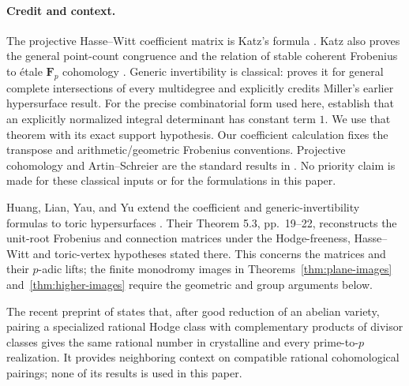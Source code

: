 \documentclass[11pt]{article}
\begin{document}
\paragraph{Credit and context.}
The projective Hasse--Witt coefficient matrix is Katz's formula \citep[\S2.3.7, pp.~34--36, especially Algorithm~2.3.7.14 and formula~2.3.7.16]{Katz1972}. Katz also proves the general point-count congruence and the relation of stable coherent Frobenius to \'etale $\mathbf F_p$ cohomology \citep[Expos\'e XXII, Proposition~2.0 and Corollary~2.1, pp.~406--407; Theorem~3.1 and Corollary~3.2, pp.~410--411]{Katz}. Generic invertibility is classical: \citet[Theorem~3, p.~142; proof pp.~142--144]{Koblitz} proves it for general complete intersections of every multidegree and explicitly credits Miller's earlier hypersurface result. For the precise combinatorial form used here, \citet[Theorem~2.3, p.~2; Proposition~2.11, p.~3 of the arXiv version]{AdolphsonSperber} establish that an explicitly normalized integral determinant has constant term $1$. We use that theorem with its exact support hypothesis. Our coefficient calculation fixes the transpose and arithmetic/geometric Frobenius conventions. Projective cohomology and Artin--Schreier are the standard results in \citet[Lemma~30.8.1 and Section~59.63]{StacksProjective,StacksAS}. No priority claim is made for these classical inputs or for the formulations in this paper.

Huang, Lian, Yau, and Yu extend the coefficient and generic-invertibility formulas to toric hypersurfaces \citep[author version, Corollaries 2.3 and 2.8, pp.\ 8--11]{HLYY}. Their Theorem 5.3, pp.\ 19--22, reconstructs the unit-root Frobenius and connection matrices under the Hodge-freeness, Hasse--Witt and toric-vertex hypotheses stated there. This concerns the matrices and their $p$-adic lifts; the finite monodromy images in Theorems~\ref{thm:plane-images} and~\ref{thm:higher-images} require the geometric and group arguments below.

The recent preprint of \citet[Theorem~1.1, pp.~1--2]{OpenAI} states that, after good reduction of an abelian variety, pairing a specialized rational Hodge class with complementary products of divisor classes gives the same rational number in crystalline and every prime-to-$p$ realization. It provides neighboring context on compatible rational cohomological pairings; none of its results is used in this paper.
\end{document}
